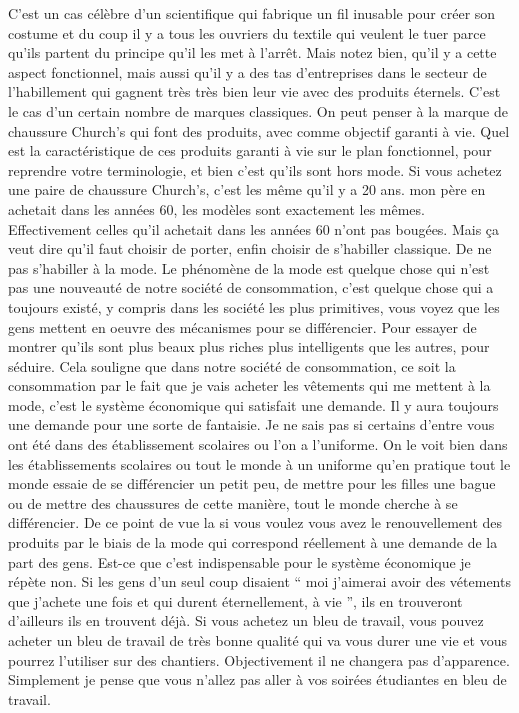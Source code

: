 \begin{small}
C'est un cas célèbre d'un scientifique  qui fabrique un fil inusable pour créer son costume et du coup il y a tous les ouvriers du textile qui veulent le tuer parce qu'ils partent du principe qu'il les met à l'arrêt. Mais notez bien, qu'il y a cette aspect fonctionnel, mais aussi qu'il y a des tas d'entreprises dans le secteur de l'habillement qui gagnent très très bien leur vie avec des produits éternels. C'est le cas d'un certain nombre de marques classiques. On peut penser à la marque de chaussure Church's qui font des produits, avec comme objectif garanti à vie. Quel est la caractéristique de ces produits garanti à vie sur le plan fonctionnel, pour reprendre votre terminologie, et bien c'est qu'ils sont hors mode. Si vous achetez une paire de chaussure Church's, c'est les même qu'il y a 20 ans. mon père en achetait dans les années 60, les modèles sont exactement les mêmes. Effectivement celles qu'il achetait dans les années 60 n'ont pas bougées. Mais ça veut dire qu'il faut choisir de porter, enfin choisir de s'habiller classique. De ne pas s'habiller à la mode. Le phénomène de la mode est quelque chose qui n'est pas une nouveauté de notre société de consommation, c'est quelque chose qui a toujours existé, y compris dans les société les plus primitives, vous voyez que les gens mettent en oeuvre des mécanismes pour se différencier. Pour essayer de montrer qu'ils sont plus beaux plus riches plus intelligents que les autres, pour séduire. Cela souligne que dans notre société de consommation, ce soit la consommation par le fait que je vais acheter les vêtements qui me mettent à la mode, c'est le système économique qui satisfait une demande. Il y aura toujours une demande pour une sorte de fantaisie. Je ne sais pas si certains d'entre vous ont été dans des établissement scolaires ou l'on a l'uniforme. On le voit bien dans les établissements scolaires ou tout le monde à un uniforme qu'en pratique tout le monde essaie de se différencier un petit peu, de mettre pour les filles une bague ou de mettre des chaussures de cette manière, tout le monde cherche à se différencier. De ce point de vue la si vous voulez vous avez le renouvellement des produits par le biais de la mode qui correspond réellement à une demande de la part des gens. Est-ce que c'est indispensable pour le système économique je répète non. Si les gens d'un seul coup disaient “ moi j'aimerai avoir des vétements que j'achete une fois et qui durent éternellement, à vie ”, ils en trouveront d'ailleurs ils en trouvent déjà. Si vous achetez un bleu de travail, vous pouvez acheter un bleu de travail de très bonne qualité qui va vous durer une vie et vous pourrez l'utiliser sur des chantiers. Objectivement il ne changera pas d'apparence. Simplement je pense que vous n'allez pas aller à vos soirées étudiantes en bleu de travail.


\end{small}
